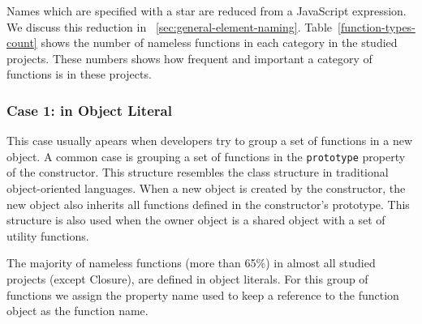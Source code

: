\documentclass[10pt, preprint]{sigplanconf}
\begin{document}
Names which are specified with a star are reduced from a JavaScript expression. We discuss this reduction in ~\ref{sec:general-element-naming}. Table~\ref{function-types-count} shows the number of nameless functions in each category in the studied projects. These numbers shows how frequent and important a category of functions is in these projects. 
  
\subsubsection{Case 1: in Object Literal}
 This case usually apears when developers try to group a set of functions in a new object. A common case is grouping a set of functions in the {\small\texttt{prototype}} property of the constructor. This structure resembles the class structure in traditional object-oriented languages. When a new object is created by the constructor, the new object also inherits all functions defined in the constructor's prototype. This structure is also used  when the owner object is a shared object with a set of utility functions.
 
 The majority of nameless functions (more than 65\%) in almost all studied projects (except Closure), are defined in object literals. For this group of functions we assign the property name used to keep a reference to the function object as the function name.     
 
\end{document}
